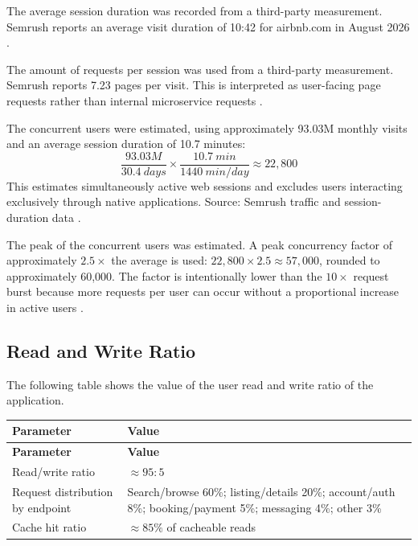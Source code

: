 The average session duration was recorded from a third-party measurement. Semrush reports an average visit 
duration of 10:42 for airbnb.com in August 2026 \cite{semrush_airbnb_2026}. 

The amount of requests per session was used from a third-party measurement. Semrush reports 7.23 pages per visit. 
This is interpreted as user-facing page requests rather than internal microservice requests \cite{semrush_airbnb_2026}.

The concurrent users were estimated, using approximately 93.03M monthly visits and an average session duration of 
10.7 minutes: \[ \frac{93.03M}{30.4\ days}\times\frac{10.7\ min}{1440\ min/day} \approx 22{,}800 \] 
This estimates simultaneously active web sessions and excludes users interacting exclusively through native applications.
Source: Semrush traffic and session-duration data \cite{semrush_airbnb_2026}.

The peak of the concurrent users was estimated. A peak concurrency factor of approximately $2.5\times$ the average 
is used: $22{,}800\times2.5\approx57{,}000$, rounded to approximately 60,000. The factor is intentionally lower than 
the $10\times$ request burst because more requests per user can occur without a proportional increase in active users
\cite{semrush_airbnb_2026}.


\subsection{Read and Write Ratio}

The following table shows the value of the user read and write ratio of the application.

\begin{longtable}{|p{}|p{}|}
    \hline
    \textbf{Parameter} & 
    \textbf{Value} \\
    \hline
    \endfirsthead

    \hline
    \textbf{Parameter} & 
    \textbf{Value} \\
    \hline
    \endhead

    Read/write ratio & 
    $\approx 95:5$ \cite{airbnb_engineering_mussel} \\ 
    \hline 
    
    Request distribution by endpoint & 
    Search/browse 60\%; listing/details 20\%; 
    account/auth 8\%; booking/payment 5\%; 
    messaging 4\%; other 3\%~\cite{educative_airbnb_system_design} \\ 
    \hline 
    
    Cache hit ratio & 
    $\approx 85\%$ of cacheable reads~\cite{educative_airbnb_system_design} \\ 
    \hline

    
\end{longtable}

